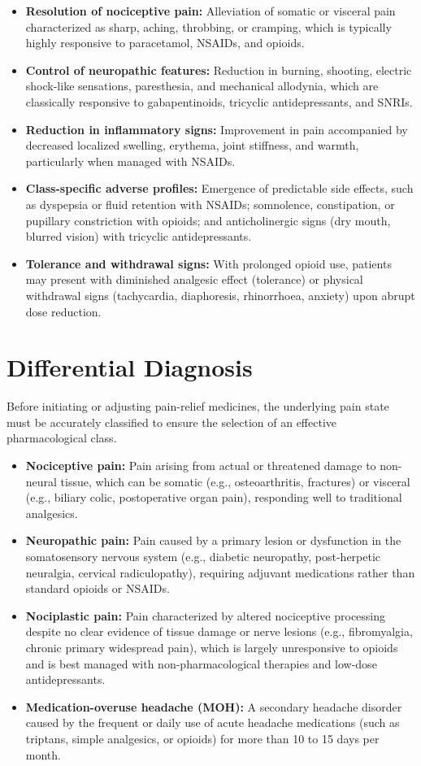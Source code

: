 \begin{itemize}
    \item \textbf{Resolution of nociceptive pain:} Alleviation of somatic or visceral pain characterized as sharp, aching, throbbing, or cramping, which is typically highly responsive to paracetamol, NSAIDs, and opioids.
    \item \textbf{Control of neuropathic features:} Reduction in burning, shooting, electric shock-like sensations, paresthesia, and mechanical allodynia, which are classically responsive to gabapentinoids, tricyclic antidepressants, and SNRIs.
    \item \textbf{Reduction in inflammatory signs:} Improvement in pain accompanied by decreased localized swelling, erythema, joint stiffness, and warmth, particularly when managed with NSAIDs.
    \item \textbf{Class-specific adverse profiles:} Emergence of predictable side effects, such as dyspepsia or fluid retention with NSAIDs; somnolence, constipation, or pupillary constriction with opioids; and anticholinergic signs (dry mouth, blurred vision) with tricyclic antidepressants.
    \item \textbf{Tolerance and withdrawal signs:} With prolonged opioid use, patients may present with diminished analgesic effect (tolerance) or physical withdrawal signs (tachycardia, diaphoresis, rhinorrhoea, anxiety) upon abrupt dose reduction.
\end{itemize}

\section*{Differential Diagnosis}
Before initiating or adjusting pain-relief medicines, the underlying pain state must be accurately classified to ensure the selection of an effective pharmacological class.

\begin{itemize}
    \item \textbf{Nociceptive pain:} Pain arising from actual or threatened damage to non-neural tissue, which can be somatic (e.g., osteoarthritis, fractures) or visceral (e.g., biliary colic, postoperative organ pain), responding well to traditional analgesics.
    \item \textbf{Neuropathic pain:} Pain caused by a primary lesion or dysfunction in the somatosensory nervous system (e.g., diabetic neuropathy, post-herpetic neuralgia, cervical radiculopathy), requiring adjuvant medications rather than standard opioids or NSAIDs.
    \item \textbf{Nociplastic pain:} Pain characterized by altered nociceptive processing despite no clear evidence of tissue damage or nerve lesions (e.g., fibromyalgia, chronic primary widespread pain), which is largely unresponsive to opioids and is best managed with non-pharmacological therapies and low-dose antidepressants.
    \item \textbf{Medication-overuse headache (MOH):} A secondary headache disorder caused by the frequent or daily use of acute headache medications (such as triptans, simple analgesics, or opioids) for more than 10 to 15 days per month.
\end{itemize}

